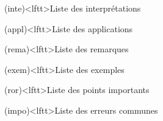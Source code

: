 \documentclass[../../main/main.tex]{subfiles}
\begin{document}
\begin{boxes}
\begin{tcb}
	\end{tcb}
	\begin{tcb}(inte)<lftt>{Liste des interprétations}
	\end{tcb}
	\begin{tcb}(appl)<lftt>{Liste des applications}
	\end{tcb}
	\begin{tcb}(rema)<lftt>{Liste des remarques}
	\end{tcb}
	\begin{tcb}(exem)<lftt>{Liste des exemples}
	\end{tcb}
	\begin{tcb}(ror)<lftt>{Liste des points importants}
	\end{tcb}
	\begin{tcb}(impo)<lftt>{Liste des erreurs communes}
	\end{tcb}
\end{boxes}
\vspace*{\fill}
\newpage
\end{document}
